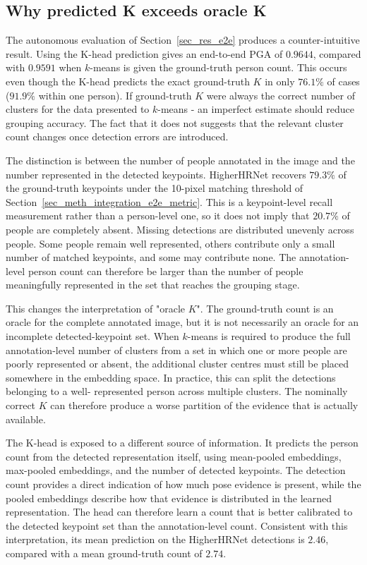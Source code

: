 \subsection{Why predicted K exceeds oracle K}
\label{sec_disc_modularity_autonomy_autonomy}

The autonomous evaluation of Section~\ref{sec_res_e2e} produces a
counter-intuitive result.
Using the K-head prediction gives an end-to-end PGA of $0.9644$,
compared with $0.9591$ when $k$-means is given the ground-truth person
count.
This occurs even though the K-head predicts the exact ground-truth $K$
in only $76.1\%$ of cases ($91.9\%$ within one person).
If ground-truth $K$ were always the correct number of clusters for the
data presented to $k$-means - an imperfect estimate should reduce
grouping accuracy.
The fact that it does not suggests that the relevant cluster count
changes once detection errors are introduced.

The distinction is between the number of people annotated in the image
and the number represented in the detected keypoints.
HigherHRNet recovers $79.3\%$ of the ground-truth keypoints under the
10-pixel matching threshold of
Section~\ref{sec_meth_integration_e2e_metric}.
This is a keypoint-level recall measurement rather than a person-level
one,
so it does not imply that $20.7\%$ of people are completely absent.
Missing detections are distributed unevenly across people.
Some people remain well represented,
others contribute only a small number of matched keypoints,
and some may contribute none.
The annotation-level person count can therefore be larger than the
number of people meaningfully represented in the set that reaches the
grouping stage.

This changes the interpretation of "oracle $K$".
The ground-truth count is an oracle for the complete annotated image,
but it is not necessarily an oracle for an incomplete detected-keypoint
set.
When $k$-means is required to produce the full annotation-level number
of clusters from a set in which one or more people are poorly
represented or absent,
the additional cluster centres must still be placed somewhere in the
embedding space.
In practice, this can split the detections belonging to a well-
represented person across multiple clusters.
The nominally correct $K$ can therefore produce a worse partition
of the evidence that is actually available.

The K-head is exposed to a different source of information.
It predicts the person count from the detected representation itself,
using mean-pooled embeddings,
max-pooled embeddings,
and the number of detected keypoints.
The detection count provides a direct indication of how much pose
evidence is present,
while the pooled embeddings describe how that evidence is distributed
in the learned representation.
The head can therefore learn a count that is better calibrated to the
detected keypoint set than the annotation-level count.
Consistent with this interpretation, its mean prediction on the
HigherHRNet detections is $2.46$, compared with a mean ground-truth
count of $2.74$.

